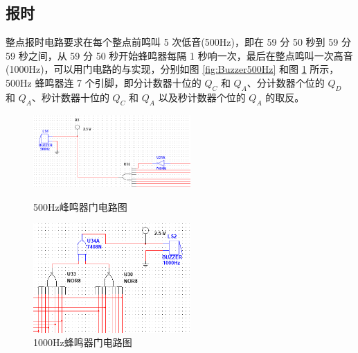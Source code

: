 \subsection{报时}

整点报时电路要求在每个整点前鸣叫 5 次低音(500Hz)，即在 59 分 50 秒到 59 分 59 秒之间，从 59 分 50 秒开始蜂鸣器每隔 1 秒响一次，最后在整点鸣叫一次高音(1000Hz)，可以用门电路的与实现，分别如图 \ref{fig:Buzzer500Hz} 和图 \ref{fig:Buzzer1000Hz} 所示，500Hz 蜂鸣器连 7 个引脚，即分计数器十位的 $Q_C$ 和 $Q_A$、分计数器个位的 $Q_D$ 和 $Q_A$、秒计数器十位的 $Q_C$ 和 $Q_A$ 以及秒计数器个位的 $Q_A$ 的取反。

\begin{figure}[htbp]
	\centering
	\begin{minipage}[t]{0.48\textwidth}
		\centering
		\includegraphics[width=6cm]{figure/Buzzer_500Hz.png}
		\caption{500Hz峰鸣器门电路图}\label{fig:Buzzer500Hz}
	\end{minipage}
	\begin{minipage}[t]{0.48\textwidth}
		\centering
		\includegraphics[width=6cm]{figure/Buzzer_1000Hz.png}
		\caption{1000Hz蜂鸣器门电路图}\label{fig:Buzzer1000Hz}
	\end{minipage}
\end{figure}